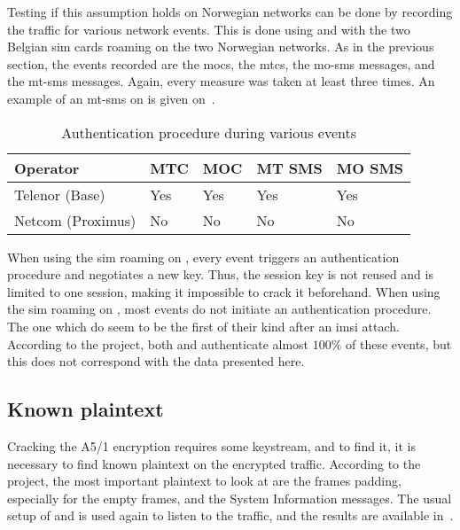       Testing if this assumption holds on Norwegian networks can be done
      by recording the traffic for various network events. This is done
      using  and  with the two Belgian
      \gls{sim} cards roaming on the two Norwegian networks. As in the
      previous section, the events recorded are the \glspl{moc}, the
      \glspl{mtc}, the \gls{mo-sms} messages, and the \gls{mt-sms}
      messages. Again, every measure was taken at least three times. An
      example of an \gls{mt-sms} on  is given
      on~.

      \begin{table}[h]
        \centering
        \begin{tabular}{@{}lllll@{}}
          \toprule
          Operator          & MTC & MOC & MT SMS & MO SMS \\
          \midrule
          Telenor (Base)    & Yes & Yes & Yes    & Yes    \\
          Netcom (Proximus) & No  & No  & No     & No     \\
          \bottomrule
        \end{tabular}
        \caption{Authentication procedure during various events}
        \label{tab:events_authentication}
      \end{table}

      When using the  \gls{sim} roaming on ,
      every event triggers an authentication procedure and negotiates a
      new key. Thus, the session key is not reused and is limited to one
      session, making it impossible to crack it beforehand. When using
      the  \gls{sim} roaming on , most
      events do not initiate an authentication procedure. The one which
      do seem to be the first of their kind after an \gls{imsi} attach.
      According to the  project, both  and
       authenticate almost $100\%$ of these events, but
      this does not correspond with the data presented here.

    \subsection{Known plaintext}

      Cracking the A5/1 encryption requires some keystream, and to find
      it, it is necessary to find known plaintext on the encrypted
      traffic. According to the  project, the most
      important plaintext to look at are the frames padding, especially
      for the empty frames, and the System Information messages. The
      usual setup of  and  is used again
      to listen to the traffic, and the results are available
      in~.

